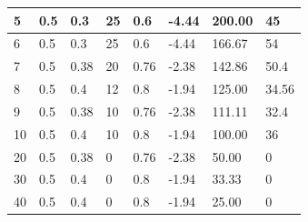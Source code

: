 \documentclass[dvipdfmx,titlepage,a4j]{jsarticle}  %
\begin{document}
\begin{table}[H]
\begin{tabular}{ll|ll|llll}
  \multicolumn{1}{l|}{5}             & 0.5         & \multicolumn{1}{l|}{0.3}         & 25              & \multicolumn{1}{l|}{0.6}     & \multicolumn{1}{l|}{-4.44}           & \multicolumn{1}{l|}{200.00}          & 45                                  \\ \hline
  \multicolumn{1}{|l|}{6}            & 0.5         & \multicolumn{1}{l|}{0.3}         & 25              & \multicolumn{1}{l|}{0.6}     & \multicolumn{1}{l|}{-4.44}           & \multicolumn{1}{l|}{166.67}          & \multicolumn{1}{l|}{54}             \\ \hline
  \multicolumn{1}{|l|}{7}            & 0.5         & \multicolumn{1}{l|}{0.38}        & 20              & \multicolumn{1}{l|}{0.76}    & \multicolumn{1}{l|}{-2.38}           & \multicolumn{1}{l|}{142.86}          & \multicolumn{1}{l|}{50.4}           \\ \hline
  \multicolumn{1}{|l|}{8}            & 0.5         & \multicolumn{1}{l|}{0.4}         & 12              & \multicolumn{1}{l|}{0.8}     & \multicolumn{1}{l|}{-1.94}           & \multicolumn{1}{l|}{125.00}          & \multicolumn{1}{l|}{34.56}          \\ \hline
  \multicolumn{1}{|l|}{9}            & 0.5         & \multicolumn{1}{l|}{0.38}        & 10              & \multicolumn{1}{l|}{0.76}    & \multicolumn{1}{l|}{-2.38}           & \multicolumn{1}{l|}{111.11}          & \multicolumn{1}{l|}{32.4}           \\ \hline
  \multicolumn{1}{|l|}{10}           & 0.5         & \multicolumn{1}{l|}{0.4}         & 10              & \multicolumn{1}{l|}{0.8}     & \multicolumn{1}{l|}{-1.94}           & \multicolumn{1}{l|}{100.00}          & \multicolumn{1}{l|}{36}             \\ \hline
  \multicolumn{1}{|l|}{20}           & 0.5         & \multicolumn{1}{l|}{0.38}        & 0               & \multicolumn{1}{l|}{0.76}    & \multicolumn{1}{l|}{-2.38}           & \multicolumn{1}{l|}{50.00}           & \multicolumn{1}{l|}{0}              \\ \hline
  \multicolumn{1}{|l|}{30}           & 0.5         & \multicolumn{1}{l|}{0.4}         & 0               & \multicolumn{1}{l|}{0.8}     & \multicolumn{1}{l|}{-1.94}           & \multicolumn{1}{l|}{33.33}           & \multicolumn{1}{l|}{0}              \\ \hline
  \multicolumn{1}{|l|}{40}           & 0.5         & \multicolumn{1}{l|}{0.4}         & 0               & \multicolumn{1}{l|}{0.8}     & \multicolumn{1}{l|}{-1.94}           & \multicolumn{1}{l|}{25.00}           & \multicolumn{1}{l|}{0}              \\ \hline

\end{tabular}
\end{table}
\end{document}
